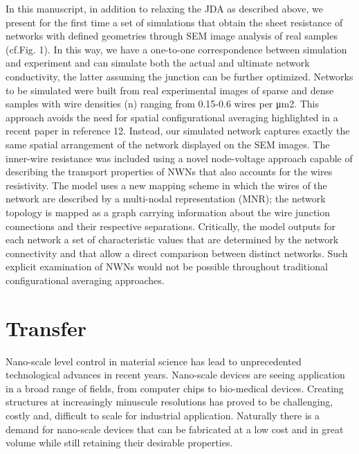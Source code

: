 In this manuscript, in addition to relaxing the JDA as described above, we present for the first time a set of simulations that obtain the sheet resistance of networks with defined geometries through SEM image analysis of real samples (cf.Fig. 1). In this way, we have a one-to-one correspondence between simulation and experiment and can simulate both the actual and ultimate network conductivity, the latter assuming the junction can be further optimized. Networks to be simulated were built from real experimental images of sparse and dense samples with wire densities (n) ranging from 0.15-0.6 wires per μm2. This approach avoids the need for spatial configurational averaging highlighted in a recent paper in reference 12. Instead, our simulated network captures exactly the same spatial arrangement of the network displayed on the SEM images. The inner-wire resistance was included using a novel node-voltage approach capable of describing the transport properties of NWNs that also accounts for the wires resistivity. The model uses a new mapping scheme in which the wires of the network are described by a multi-nodal representation (MNR); the network topology is mapped as a graph carrying information about the wire junction connections and their respective separations. Critically, the model outputs for each network a set of characteristic values that are determined by the network connectivity and that allow a direct comparison between distinct networks. Such explicit examination of NWNs would not be possible throughout traditional configurational averaging approaches.
\section{Transfer}
Nano-scale level control in material science has lead to unprecedented technological advances in recent years. Nano-scale devices are seeing application in a broad range of fields, from computer chips to bio-medical devices. Creating structures at increasingly minuscule resolutions has proved to be challenging, costly and, difficult to scale for industrial application. Naturally there is a demand for nano-scale devices that can be fabricated at a low cost and in great volume while still retaining their desirable properties.

